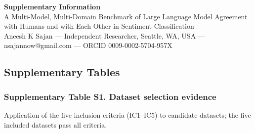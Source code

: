 \documentclass[11pt]{article}
\begin{document}
\begin{center}{\Large\bfseries Supplementary Information}\\[6pt]{\large A Multi-Model, Multi-Domain Benchmark of Large Language Model Agreement with Humans and with Each Other in Sentiment Classification}\\[4pt]Aneesh K Sajan --- Independent Researcher, Seattle, WA, USA --- asajannow@gmail.com --- ORCID 0009-0002-5704-957X\end{center}
\vspace{6pt}
\subsection{Supplementary Tables}\label{supplementary-tables}

\subsubsection{Supplementary Table S1. Dataset selection
evidence}\label{supplementary-table-s1.-dataset-selection-evidence}

Application of the five inclusion criteria (IC1--IC5) to candidate
datasets; the five included datasets pass all criteria.
\end{document}
